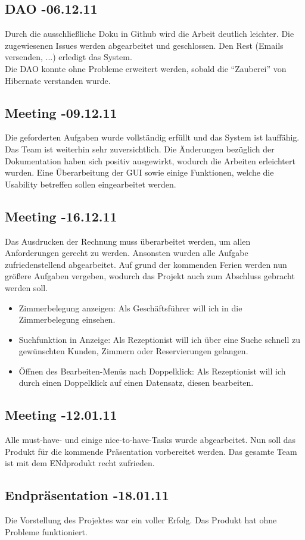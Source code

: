 \documentclass[11pt]{scrartcl}
\begin{document}
\subsection{DAO -06.12.11}

Durch die ausschließliche Doku in Github wird die Arbeit deutlich leichter. Die zugewiesenen Issues werden abgearbeitet und geschlossen. Den Rest (Emails versenden, ...) erledigt das System. \\
Die DAO konnte ohne Probleme erweitert werden, sobald die ``Zauberei'' von Hibernate verstanden wurde.

\subsection{Meeting -09.12.11}

Die geforderten Aufgaben wurde vollständig erfüllt und das System ist lauffähig. Das Team ist weiterhin sehr zuversichtlich. Die Änderungen bezüglich der Dokumentation haben sich positiv ausgewirkt, wodurch die Arbeiten erleichtert wurden. Eine Überarbeitung der GUI sowie einige Funktionen, welche die Usability betreffen sollen eingearbeitet werden.

\subsection{Meeting -16.12.11}

Das Ausdrucken der Rechnung muss überarbeitet werden, um allen Anforderungen gerecht zu werden. Ansonsten wurden alle Aufgabe zufriedenstellend abgearbeitet. Auf grund der kommenden Ferien werden nun größere Aufgaben vergeben, wodurch das Projekt auch zum Abschluss gebracht werden soll.
\begin{itemize}
\item Zimmerbelegung anzeigen:
Als Geschäftsführer will ich in die Zimmerbelegung einsehen.
\item Suchfunktion in Anzeige:
Als Rezeptionist will ich über eine Suche schnell zu gewünschten Kunden, Zimmern oder Reservierungen gelangen.
\item Öffnen des Bearbeiten-Menüs nach Doppelklick:
Als Rezeptionist will ich durch einen Doppelklick auf einen Datensatz, diesen bearbeiten.
\end{itemize}

\subsection{Meeting -12.01.11}
Alle must-have- und einige nice-to-have-Tasks wurde abgearbeitet. Nun soll das Produkt 
für die kommende Präsentation vorbereitet werden. Das gesamte Team ist mit dem ENdprodukt recht zufrieden.

\subsection{Endpräsentation -18.01.11}
Die Vorstellung des Projektes war ein voller Erfolg. Das Produkt hat ohne Probleme funktioniert.
\end{document}
